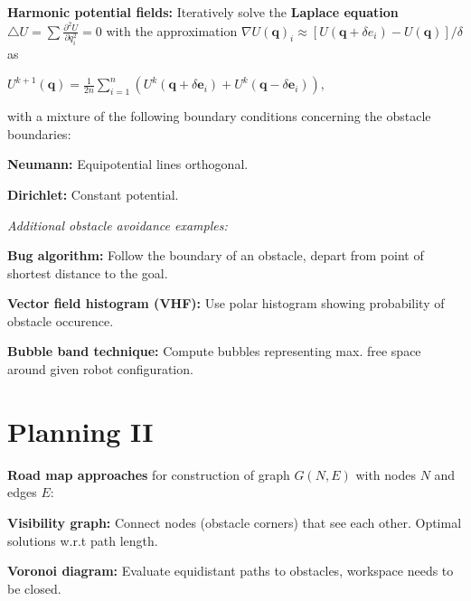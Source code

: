 \documentclass[landscape]{article}
\newcommand{\vmspace}{\vspace{-7pt}}
\newcommand{\vpspace}{\vspace{5pt}}
\newcommand{\vtspace}{\vspace{-10pt}}
\begin{document}
\begin{multicols}{3}
\begin{minipage}{\columnwidth}
  \textbf{Harmonic potential fields:} Iteratively solve the \textbf{Laplace
  equation}
  $
  \bigtriangleup U = \sum \frac{\partial^2 U}{\partial q_i^2} = 0
  $ with the approximation
  $
  \nabla U(\mathbf q)_i
  \approx
  [U(\mathbf q + \delta e_i) - U(\mathbf q)]/\delta
  $
  as
  \vmspace
  \begin{center}
    $
    U^{k+1}(\mathbf q)
    =
    \frac{1}{2n} \sum_{i=1}^n(U^k(\mathbf q + \delta \mathbf e_i)
    + U^k(\mathbf q - \delta \mathbf e_i)),
    $
  \end{center}
  \vmspace
  with a mixture of the following boundary conditions concerning the obstacle
  boundaries:
  \begin{compactitem}
  \item \textbf{Neumann:} Equipotential lines orthogonal.
  \item \textbf{Dirichlet:} Constant potential.
  \end{compactitem}
\end{minipage}

\vpspace

\begin{minipage}{\columnwidth}
  \textit{Additional obstacle avoidance examples:}
  \begin{compactitem}
  \item \textbf{Bug algorithm:} Follow the boundary of an obstacle, depart from
    point of shortest distance to the goal.
  \item \textbf{Vector field histogram (VHF):} Use polar histogram showing
    probability of obstacle occurence.
  \item \textbf{Bubble band technique:} Compute bubbles representing max.
    free space around given robot configuration.
  \end{compactitem}
\end{minipage}

\vfill

\vtspace

\section{Planning II}

\vmspace

\begin{minipage}{\columnwidth}
  \textbf{Road map approaches} for construction of graph $G(N,E)$ with nodes $N$
  and edges $E$:
  \begin{compactitem}
  \item \textbf{Visibility graph:} Connect nodes (obstacle corners) that
    see each other. Optimal solutions w.r.t path length.
  \item \textbf{Voronoi diagram:} Evaluate equidistant paths to obstacles,
    workspace needs to be closed.
  \end{compactitem}
\end{minipage}


\end{multicols}
\end{document}
